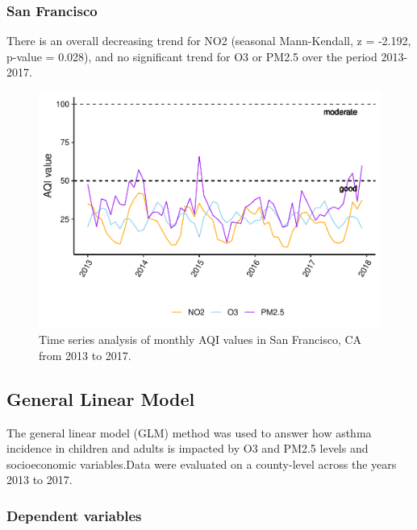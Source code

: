 \documentclass[12pt,]{article}
\begin{document}
\newpage

\hypertarget{san-francisco}{%
\subsubsection{San Francisco}\label{san-francisco}}

There is an overall decreasing trend for NO2 (seasonal Mann-Kendall, z =
-2.192, p-value = 0.028), and no significant trend for O3 or PM2.5 over
the period 2013-2017.

\begin{figure}
\centering
\includegraphics{FinalProject_AliciaZhao_files/figure-latex/unnamed-chunk-20-1.pdf}
\caption{Time series analysis of monthly AQI values in San Francisco, CA
from 2013 to 2017.}
\end{figure}

\newpage

\hypertarget{general-linear-model}{%
\subsection{General Linear Model}\label{general-linear-model}}

The general linear model (GLM) method was used to answer how asthma
incidence in children and adults is impacted by O3 and PM2.5 levels and
socioeconomic variables.Data were evaluated on a county-level across the
years 2013 to 2017.

\hypertarget{dependent-variables}{%
\subsubsection{Dependent variables}\label{dependent-variables}}
\end{document}
